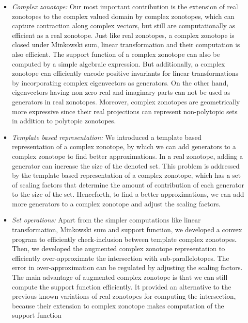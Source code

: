 %
\begin{itemize}
\item \emph{Complex zonotope: } Our most important contribution is the
  extension of real zonotopes to the complex valued domain by
  complex zonotopes, which can capture contraction along complex
  vectors, but still are computationally as efficient as a real
  zonotope.  Just like real zonotopes, a complex zonotope is closed
  under Minkowski sum, linear transformation and their computation is
  also efficient.  The support function of a complex zonotope can also
  be computed by a simple algebraic expression.  But additionally, a
  complex zonotope can efficiently encode positive invariants for
  linear transformations by incorporating complex eigenvectors as
  generators.  On the other hand, eigenvectors having non-zero real
  and imaginary parts can not be used as generators in real zonotopes.
  Moreover, complex zonotopes are geometrically more expressive since
  their real projections can represent non-polytopic sets in addition
  to polytopic zonotopes.
\item \emph{Template based representation: } We introduced a template
  based representation of a complex zonotope, by which we can add
  generators to a complex zonotope to find better approximations.  In
  a real zonotope, adding a generator can increase the size of the
  denoted set.  This problem is addressed by the template based
  representation of a complex zonotope, which has a set of scaling
  factors that determine the amount of contribution of each generator
  to the size of the set.  Henceforth, to find a better
  approximations, we can add more generators to a complex zonotope and
  adjust the scaling factors.
\item \emph{Set operations: } Apart from the simpler computations like
  linear transformation, Minkowski sum and support function, we
  developed a convex program to efficiently check-inclusion between
  template complex zonotopes.  Then, we developed the augmented
  complex zonotope representation to efficiently over-approximate the
  intersection with sub-parallelotopes.  The error in
  over-approximation can be regulated by adjusting the scaling
  factors.  The main advantage of augmented complex zonotope is that
  we can still compute the support function efficiently.  It
  provided an alternative to the previous known variations of real
  zonotopes for computing the intersection, because their extension to
  complex zonotope makes computation of the support function

\end{itemize}
